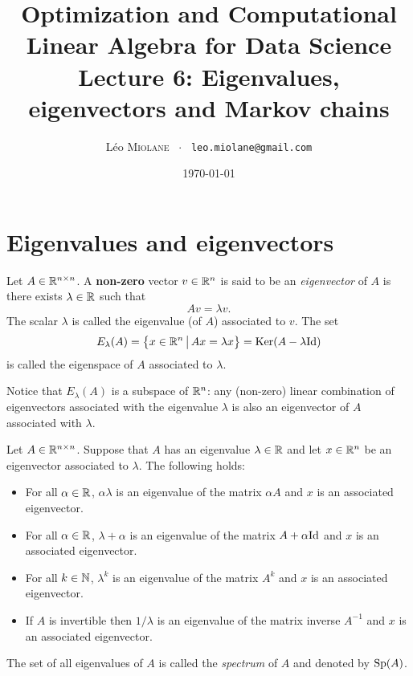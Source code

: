 \documentclass[11pt,nocut]{article}
\title{\vspace{-2.0cm}%
	Optimization and Computational Linear Algebra for Data Science\\
Lecture 6: Eigenvalues, eigenvectors and Markov chains}
\author{Léo \textsc{Miolane} \ $\cdot$ \ \texttt{leo.miolane@gmail.com}}
\date{\today}
\begin{document}
\maketitle


\section{Eigenvalues and eigenvectors}

\begin{definition}
	Let $A \in \mathbb{R}^{n \times n}$. A \textbf{non-zero} vector $v \in \mathbb{R}^n$ is said to be an \emph{eigenvector} of $A$ is there exists $\lambda \in \mathbb{R}$ such that
	$$
	A v = \lambda v.
	$$
	The scalar $\lambda$ is called the eigenvalue (of $A$) associated to $v$. The set
	$$
	E_{\lambda}(A) = \big\{ x \in \mathbb{R}^n \, \big| \, Ax = \lambda x \big\} = {{\rm Ker}}(A-\lambda {{\rm Id}})
	$$
	is called the eigenspace of $A$ associated to $\lambda$.
\end{definition}

\begin{remark}
	Notice that $E_{\lambda}(A)$ is a subspace of $\mathbb{R}^n$: any (non-zero) linear combination of eigenvectors associated with the eigenvalue $\lambda$ is also an eigenvector of $A$ associated with $\lambda$.
\end{remark}

\begin{proposition}
	Let $A \in \mathbb{R}^{n \times n}$. 
	Suppose that $A$ has an eigenvalue $\lambda \in \mathbb{R}$ and let $x \in \mathbb{R}^n$ be an eigenvector associated to $\lambda$.
	The following holds:
	\begin{itemize}
		\item For all $\alpha \in \mathbb{R}$, $\alpha \lambda$ is an eigenvalue of the matrix $\alpha A$ and $x$ is an associated eigenvector.
		\item For all $\alpha \in \mathbb{R}$, $\lambda + \alpha$ is an eigenvalue of the matrix $A + \alpha {{\rm Id}}$ and $x$ is an associated eigenvector.
		\item For all $k \in \mathbb{N}$, $\lambda^k$ is an eigenvalue of the matrix $A^k$ and $x$ is an associated eigenvector.
		\item If $A$ is invertible then $1/\lambda$ is an eigenvalue of the matrix inverse $A^{-1}$ and $x$ is an associated eigenvector.
	\end{itemize}
\end{proposition}

\begin{definition}
	The set of all eigenvalues of $A$ is called the \emph{spectrum} of $A$ and denoted by ${{\rm Sp}}(A)$.
\end{definition}
\end{document}
